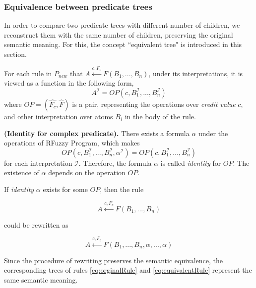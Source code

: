 \subsubsection{Equivalence between predicate trees}
\label{sec:EquivalentTree}
In order to compare two predicate trees with different number of children, we reconstruct them with the same number of children, preserving the original semantic meaning. For this, the concept ``equivalent tree" is introduced in this section.

For each rule in $P_{new}$ that $A \stackrel{c,F_c}{\longleftarrow}F(B_1,...,B_n)$, under its interpretations, it is viewed as a function in the following form,
\[A^{\mathcal{I}} = OP (c,B_1^{\mathcal{I}},...,B_n^{\mathcal{I}})\]
where $OP=(\hat{F_c},\hat{F})$ is a pair, representing the operations over \textit{credit value} $c$, and other interpretation over atoms $B_i$ in the body of the rule. 

\begin{defin}\textbf{(Identity for complex predicate).}
\label{def:IdentityComplex}
 There exists a formula $\alpha$ under the operations of RFuzzy Program, which makes
 \begin{equation}\label{eq:equivalentFormula}
 OP(c,B_1^{\mathcal{I}},...,B_n^{\mathcal{I}},\alpha^{\mathcal{I}})=OP(c,B_1^{\mathcal{I}},...,B_n^{\mathcal{I}})
 \end{equation}
for each interpretation $\mathcal{I}$. Therefore, the formula $\alpha$ is called \textit{identity} for $OP$. The existence of $\alpha$ depends on the operation $OP$.
\end{defin}

If \textit{identity} $\alpha$ exists for some $OP$, then the rule
\begin{center}
\begin{equation}\label{eq:orginalRule}
A \stackrel{c,F_c}{\longleftarrow}F(B_1,...,B_n)
\end{equation}
\end{center}
could be rewritten as
\begin{center}
\begin{equation}\label{eq:equivalentRule}
A \stackrel{c,F_c}{\longleftarrow}F(B_1,...,B_n,\alpha,...,\alpha)
\end{equation}
\end{center}

Since the procedure of rewriting preserves the semantic equivalence, the corresponding trees of rules \ref{eq:orginalRule} and \ref{eq:equivalentRule} represent the same semantic meaning.

